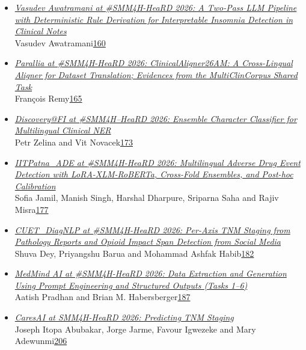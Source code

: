 \documentclass[11pt,oneside]{book}
\begin{document}
\begin{itemize}[leftmargin=*,label={}]
       \item \hyperlink{page.160}{\emph{Vasudev Awatramani at \#SMM4H-HeaRD 2026: A Two-Pass LLM Pipeline with Deterministic Rule Derivation for Interpretable Insomnia Detection in Clinical Notes}}\\ \hspace*{2em} Vasudev Awatramani\dotfill \hyperlink{page.160}{160}
       \item \hyperlink{page.165}{\emph{Parallia at \#SMM4H-HeaRD 2026: ClinicalAligner26AM: A Cross-Lingual Aligner for Dataset Translation; Evidences from the MultiClinCorpus Shared Task}}\\ \hspace*{2em} François Remy\dotfill \hyperlink{page.165}{165}
       \item \hyperlink{page.173}{\emph{Discovery@FI at \#SMM4H–HeaRD 2026: Ensemble Character Classifier for Multilingual Clinical NER}}\\ \hspace*{2em} Petr Zelina and Vit Novacek\dotfill \hyperlink{page.173}{173}
       \item \hyperlink{page.177}{\emph{IITPatna\_ADE at \#SMM4H-HeaRD 2026: Multilingual Adverse Drug Event Detection with LoRA-XLM-RoBERTa, Cross-Fold Ensembles, and Post-hoc Calibration}}\\ \hspace*{2em} Sofia Jamil, Manish Singh, Harshal Dharpure, Sriparna Saha and Rajiv Misra\dotfill \hyperlink{page.177}{177}
       \item \hyperlink{page.182}{\emph{CUET\_DiagNLP at \#SMM4H-HeaRD 2026: Per-Axis TNM Staging from Pathology Reports and Opioid Impact Span Detection from Social Media}}\\ \hspace*{2em} Shuva Dey, Priyangshu Barua and Mohammad Ashfak Habib\dotfill \hyperlink{page.182}{182}
       \item \hyperlink{page.187}{\emph{MedMind AI at \#SMM4H-HeaRD 2026: Data Extraction and Generation Using Prompt Engineering and Structured Outputs (Tasks 1–6)}}\\ \hspace*{2em} Aatish Pradhan and Brian M. Habersberger\dotfill \hyperlink{page.187}{187}
       \item \hyperlink{page.206}{\emph{CaresAI at SMM4H-HeaRD 2026: Predicting TNM Staging}}\\ \hspace*{2em} Joseph Itopa Abubakar, Jorge Jarme, Favour Igwezeke and Mary Adewunmi\dotfill \hyperlink{page.206}{206}

\end{itemize}
\end{document}
